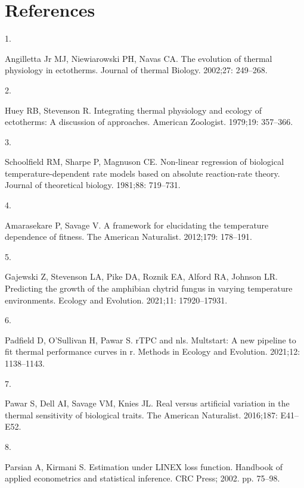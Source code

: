 \documentclass[
  11pt,
  letterpaper,
]{article}
\newlength{\cslhangindent}
\newlength{\csllabelwidth}
\newenvironment{CSLReferences}[2] %
 {\begin{list}{}{%
  \setlength{\itemindent}{0pt}
  \setlength{\leftmargin}{0pt}
  \setlength{\parsep}{0pt}
  \ifodd #1
   \setlength{\leftmargin}{\cslhangindent}
   \setlength{\itemindent}{-1\cslhangindent}
  \fi
  \setlength{\itemsep}{#2\baselineskip}}}
 {\end{list}}
\newcommand{\CSLLeftMargin}[1]{\parbox[t]{\csllabelwidth}{\strut#1\strut}}
\newcommand{\CSLRightInline}[1]{\parbox[t]{\linewidth - \csllabelwidth}{\strut#1\strut}}
\begin{document}
{}

\section*{References}\label{references}

\label{refs}
\begin{CSLReferences}{0}{1}
\CSLLeftMargin{1. }%
\CSLRightInline{Angilletta Jr MJ, Niewiarowski PH, Navas CA. The
evolution of thermal physiology in ectotherms. Journal of thermal
Biology. 2002;27: 249--268. }

\CSLLeftMargin{2. }%
\CSLRightInline{Huey RB, Stevenson R. Integrating thermal physiology and
ecology of ectotherms: A discussion of approaches. American Zoologist.
1979;19: 357--366. }

\CSLLeftMargin{3. }%
\CSLRightInline{Schoolfield RM, Sharpe P, Magnuson CE. Non-linear
regression of biological temperature-dependent rate models based on
absolute reaction-rate theory. Journal of theoretical biology. 1981;88:
719--731. }

\CSLLeftMargin{4. }%
\CSLRightInline{Amarasekare P, Savage V. A framework for elucidating the
temperature dependence of fitness. The American Naturalist. 2012;179:
178--191. }

\CSLLeftMargin{5. }%
\CSLRightInline{Gajewski Z, Stevenson LA, Pike DA, Roznik EA, Alford RA,
Johnson LR. Predicting the growth of the amphibian chytrid fungus in
varying temperature environments. Ecology and Evolution. 2021;11:
17920--17931. }

\CSLLeftMargin{6. }%
\CSLRightInline{Padfield D, O'Sullivan H, Pawar S. rTPC and nls.
Multstart: A new pipeline to fit thermal performance curves in r.
Methods in Ecology and Evolution. 2021;12: 1138--1143. }

\CSLLeftMargin{7. }%
\CSLRightInline{Pawar S, Dell AI, Savage VM, Knies JL. Real versus
artificial variation in the thermal sensitivity of biological traits.
The American Naturalist. 2016;187: E41--E52. }

\CSLLeftMargin{8. }%
\CSLRightInline{Parsian A, Kirmani S. Estimation under LINEX loss
function. Handbook of applied econometrics and statistical inference.
CRC Press; 2002. pp. 75--98. }


\end{CSLReferences}
\end{document}
